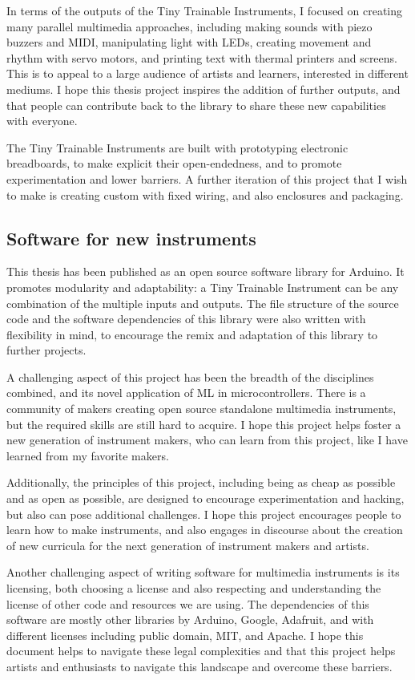 In terms of the outputs of the Tiny Trainable Instruments, I focused on creating many parallel multimedia approaches, including making sounds with piezo buzzers and MIDI, manipulating light with LEDs, creating movement and rhythm with servo motors, and printing text with thermal printers and screens. This is to appeal to a large audience of artists and learners, interested in different mediums. I hope this thesis project inspires the addition of further outputs, and that people can contribute back to the library to share these new capabilities with everyone.

The Tiny Trainable Instruments are built with prototyping electronic breadboards, to make explicit their open-endedness, and to promote experimentation and lower barriers. A further iteration of this project that I wish to make is creating custom  with fixed wiring, and also enclosures and packaging.

\subsection{Software for new instruments}

This thesis has been published as an open source software library for Arduino. It promotes modularity and adaptability: a Tiny Trainable Instrument can be any combination of the multiple inputs and outputs. The file structure of the source code and the software dependencies of this library were also written with flexibility in mind, to encourage the remix and adaptation of this library to further projects.

A challenging aspect of this project has been the breadth of the disciplines combined, and its novel application of \acrshort{ML} in microcontrollers. There is a community of makers creating open source standalone multimedia instruments, but the required skills are still hard to acquire. I hope this project helps foster a new generation of instrument makers, who can learn from this project, like I have learned from my favorite makers.

Additionally, the principles of this project, including being as cheap as possible and as open as possible, are designed to encourage experimentation and hacking, but also can pose additional challenges. I hope this project encourages people to learn how to make instruments, and also engages in discourse about the creation of new curricula for the next generation of instrument makers and artists.

Another challenging aspect of writing software for multimedia instruments is its licensing, both choosing a license and also respecting and understanding the license of other code and resources we are using. The dependencies of this software are mostly other libraries by Arduino, Google, Adafruit, and with different licenses including public domain, MIT, and Apache. I hope this document helps to navigate these legal complexities and that this project helps artists and enthusiasts to navigate this landscape and overcome these barriers.

